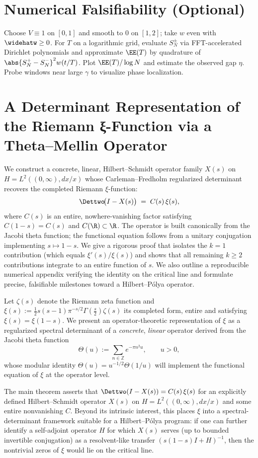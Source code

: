 \section{Numerical Falsifiability (Optional)}
Choose $V\equiv1$ on $[0,1]$ and smooth to 0 on $[1,2]$; take $w$ even with $\widehatw\ge0$. For $T$ on a logarithmic grid, evaluate $S_N^\pm$ via FFT-accelerated Dirichlet polynomials and approximate $\EE(T)$ by quadrature of $\abs{S_N^+-S_N^-}^2 w(t/T)$. Plot $\EE(T)/\log N$ and estimate the observed gap $\eta$. Probe windows near large $\gamma$ to visualize phase localization.


\section{A Determinant Representation of the Riemann ξ-Function via a
Theta–Mellin Operator}
We construct a concrete, linear, Hilbert--Schmidt operator family \(X(s)\) on \(H=L^2((0,\infty),dx/x)\) whose Carleman--Fredholm regularized determinant recovers the completed Riemann \(\xi\)-function:
\[
\Dettwo\!\big(I-X(s)\big) \;=\; C(s)\,\xi(s),
\]
where \(C(s)\) is an entire, nowhere-vanishing factor satisfying \(C(1-s)=C(s)\) and \(C(\R)\subset\R\). The operator is built canonically from the Jacobi theta function; the functional equation follows from a unitary conjugation implementing \(s\mapsto 1-s\). We give a rigorous proof that isolates the \(k=1\) contribution (which equals \(\xi'(s)/\xi(s)\)) and shows that all remaining \(k\ge 2\) contributions integrate to an entire function of \(s\). We also outline a reproducible numerical appendix verifying the identity on the critical line and formulate precise, falsifiable milestones toward a Hilbert--Pólya operator.

Let \(\zeta(s)\) denote the Riemann zeta function and \(\xi(s):=\tfrac12 s(s-1)\pi^{-s/2}\Gamma(\tfrac{s}{2})\zeta(s)\) its completed form, entire and satisfying \(\xi(s)=\xi(1-s)\). We present an operator-theoretic representation of \(\xi\) as a regularized spectral determinant of a \emph{concrete}, \emph{linear} operator derived from the Jacobi theta function
\[
\Theta(u):=\sum_{n\in\mathbb{Z}} e^{-\pi n^2 u}, \qquad u>0,
\]
whose modular identity \(\Theta(u)=u^{-1/2}\Theta(1/u)\) will implement the functional equation of \(\xi\) at the operator level.

The main theorem asserts that \(\Dettwo(I-X(s))=C(s)\,\xi(s)\) for an explicitly defined Hilbert--Schmidt operator \(X(s)\) on \(H=L^2((0,\infty),dx/x)\) and some entire nonvanishing \(C\). Beyond its intrinsic interest, this places \(\xi\) into a spectral-determinant framework suitable for a Hilbert--Pólya program: if one can further identify a self-adjoint operator \(H\) for which \(X(s)\) serves (up to bounded invertible conjugation) as a resolvent-like transfer \((s(1-s)I+H)^{-1}\), then the nontrivial zeros of \(\xi\) would lie on the critical line.

